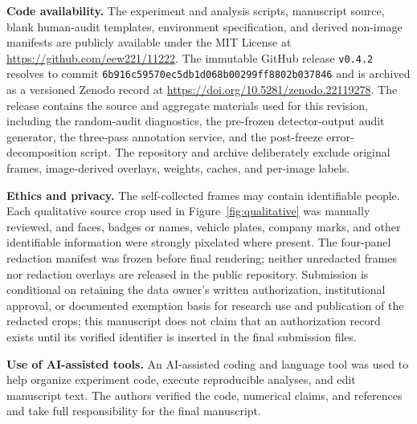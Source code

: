 \documentclass[iicol,pdflatex,sn-mathphys-num]{sn-jnl}
\begin{document}
\textbf{Code availability.} The experiment and analysis scripts, manuscript source, blank human-audit templates, environment specification, and derived non-image manifests are publicly available under the MIT License at \url{https://github.com/eew221/11222}. The immutable GitHub release \texttt{v0.4.2} resolves to commit \texttt{6b916c59570ec5db1d068b00299ff8802b037846} and is archived as a versioned Zenodo record at \url{https://doi.org/10.5281/zenodo.22119278}. The release contains the source and aggregate materials used for this revision, including the random-audit diagnostics, the pre-frozen detector-output audit generator, the three-pass annotation service, and the post-freeze error-decomposition script. The repository and archive deliberately exclude original frames, image-derived overlays, weights, caches, and per-image labels.

\textbf{Ethics and privacy.} The self-collected frames may contain identifiable people. Each qualitative source crop used in Figure~\ref{fig:qualitative} was manually reviewed, and faces, badges or names, vehicle plates, company marks, and other identifiable information were strongly pixelated where present. The four-panel redaction manifest was frozen before final rendering; neither unredacted frames nor redaction overlays are released in the public repository. Submission is conditional on retaining the data owner's written authorization, institutional approval, or documented exemption basis for research use and publication of the redacted crops; this manuscript does not claim that an authorization record exists until its verified identifier is inserted in the final submission files.

\textbf{Use of AI-assisted tools.} An AI-assisted coding and language tool was used to help organize experiment code, execute reproducible analyses, and edit manuscript text. The authors verified the code, numerical claims, and references and take full responsibility for the final manuscript.


\end{document}
